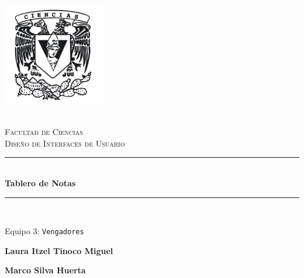 \begin{titlepage}
    \center 
    \newcommand{\HRule}{\rule{\linewidth}{0.5mm}} 
    
    \includegraphics[width=4.5cm]{IMA/cienciasWhite.png}
    
    \quad \\[0.2cm]
    \textsc{\huge Facultad de Ciencias}\\[.6cm] 
    \textsc{\huge Diseño de Interfaces de Usuario}\\[0.5cm]
    
    \makeatletter
        \HRule \\ [0.4cm]
            { \huge \bfseries Tablero de Notas}\\
        \HRule \\ [0.4cm]
        
    \vspace{2mm}
    
    \begin{flushleft}
        \Large{Equipo 3:} \texttt{\Large Vengadores} \\[1.4cm]
    \end{flushleft}

    \vspace{5mm}
    
    \begin{minipage}{0.4\textwidth}
            \textbf{\Large{Laura Itzel Tinoco Miguel}}\\        
    \end{minipage}
    \begin{minipage}{0.4\textwidth}
        \begin{flushright}
            \textbf{\Large{Marco Silva Huerta}}\\        
        \end{flushright}
    \end{minipage}
    

\end{titlepage}
